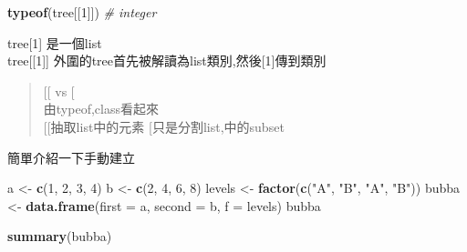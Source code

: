 \documentclass[]{book}
\newenvironment{Shaded}{\begin{snugshade}}{\end{snugshade}}
\newcommand{\CommentTok}[1]{\textcolor[rgb]{0.56,0.35,0.01}{\textit{#1}}}
\newcommand{\DataTypeTok}[1]{\textcolor[rgb]{0.13,0.29,0.53}{#1}}
\newcommand{\DecValTok}[1]{\textcolor[rgb]{0.00,0.00,0.81}{#1}}
\newcommand{\KeywordTok}[1]{\textcolor[rgb]{0.13,0.29,0.53}{\textbf{#1}}}
\newcommand{\NormalTok}[1]{#1}
\newcommand{\OperatorTok}[1]{\textcolor[rgb]{0.81,0.36,0.00}{\textbf{#1}}}
\newcommand{\StringTok}[1]{\textcolor[rgb]{0.31,0.60,0.02}{#1}}
\theoremstyle{definition}
\theoremstyle{definition}
\theoremstyle{definition}
\theoremstyle{remark}
\begin{document}
\begin{Shaded}
\end{Shaded}

\begin{Shaded}
\begin{Highlighting}[]
\KeywordTok{typeof}\NormalTok{(tree[[}\DecValTok{1}\NormalTok{]]) }\CommentTok{# integer}
\end{Highlighting}
\end{Shaded}

tree{[}1{]} 是一個list\\
tree{[}{[}1{]}{]}
外圍的tree\protect\hyperlink{section-1}{}首先被解讀為list類別,然後{[}1{]}傳到類別

\begin{quote}
{[}{[} vs {[}\\
由typeof,class看起來\\
{[}{[}抽取list中的元素 {[}只是分割list,中的subset
\end{quote}

簡單介紹一下手動建立

\begin{Shaded}
\begin{Highlighting}[]
\NormalTok{a <-}\StringTok{ }\KeywordTok{c}\NormalTok{(}\DecValTok{1}\NormalTok{, }\DecValTok{2}\NormalTok{, }\DecValTok{3}\NormalTok{, }\DecValTok{4}\NormalTok{)}
\NormalTok{b <-}\StringTok{ }\KeywordTok{c}\NormalTok{(}\DecValTok{2}\NormalTok{, }\DecValTok{4}\NormalTok{, }\DecValTok{6}\NormalTok{, }\DecValTok{8}\NormalTok{)}
\NormalTok{levels <-}\StringTok{ }\KeywordTok{factor}\NormalTok{(}\KeywordTok{c}\NormalTok{(}\StringTok{"A"}\NormalTok{, }\StringTok{"B"}\NormalTok{, }\StringTok{"A"}\NormalTok{, }\StringTok{"B"}\NormalTok{))}
\NormalTok{bubba <-}\StringTok{ }\KeywordTok{data.frame}\NormalTok{(}\DataTypeTok{first =}\NormalTok{ a,}
                      \DataTypeTok{second =}\NormalTok{ b,}
                      \DataTypeTok{f =}\NormalTok{ levels)}
\NormalTok{bubba}
\end{Highlighting}
\end{Shaded}

\begin{Shaded}
\begin{Highlighting}[]
\KeywordTok{summary}\NormalTok{(bubba)}
\end{Highlighting}
\end{Shaded}
\end{document}
